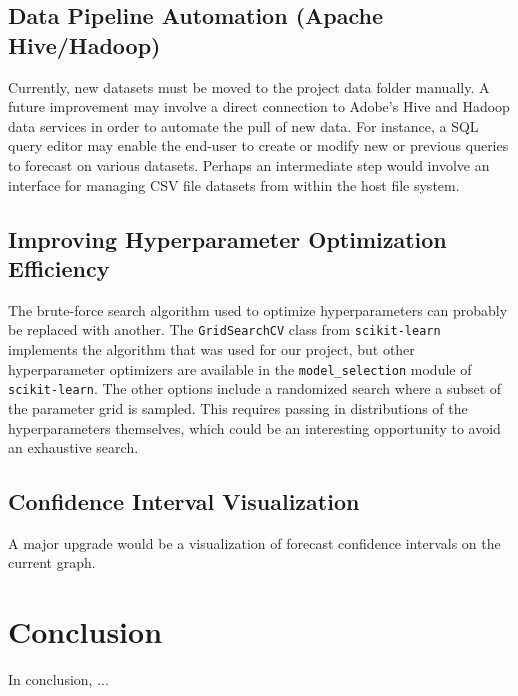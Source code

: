 \documentclass[11pt, oneside]{article}
\begin{document}
\subsection{Data Pipeline Automation (Apache Hive/Hadoop)}
Currently, new datasets must be moved to the project data folder manually. A future improvement may involve a direct connection to Adobe's Hive and Hadoop data services in order to automate the pull of new data. For instance, a SQL query editor may enable the end-user to create or modify new or previous queries to forecast on various datasets. Perhaps an intermediate step would involve an interface for managing CSV file datasets from within the host file system.

\subsection{Improving Hyperparameter Optimization Efficiency}
  \label{improving_hyperparameter_optimization_efficiency}
  The brute-force search algorithm used to optimize hyperparameters can probably be replaced with another. The \texttt{GridSearchCV} class from \texttt{scikit-learn} implements the algorithm that was used for our project, but other hyperparameter optimizers are available in the \texttt{model\_selection} module of \texttt{scikit-learn}. The other options include a randomized search where a subset of the parameter grid is sampled. This requires passing in distributions of the hyperparameters themselves, which could be an interesting opportunity to avoid an exhaustive search.

\subsection{Confidence Interval Visualization}
A major upgrade would be a visualization of forecast confidence intervals on the current graph.

\section{Conclusion}
In conclusion, ...
\end{document}
